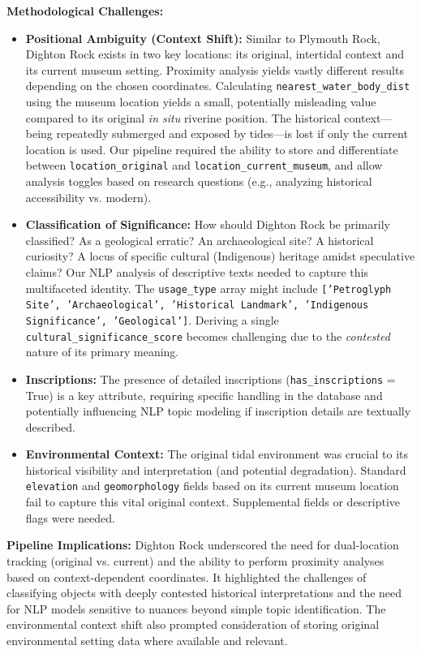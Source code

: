 \documentclass[
11pt, %
english, %
singlespacing, %
headsepline, %
]{MastersDoctoralThesis} %
\begin{document}
\textbf{Methodological Challenges:}
\begin{itemize}
    \item \textbf{Positional Ambiguity (Context Shift):} Similar to Plymouth Rock, Dighton Rock exists in two key locations: its original, intertidal context and its current museum setting. Proximity analysis yields vastly different results depending on the chosen coordinates. Calculating \texttt{nearest\_water\_body\_dist} using the museum location yields a small, potentially misleading value compared to its original \emph{in situ} riverine position. The historical context—being repeatedly submerged and exposed by tides—is lost if only the current location is used. Our pipeline required the ability to store and differentiate between \texttt{location\_original} and \texttt{location\_current\_museum}, and allow analysis toggles based on research questions (e.g., analyzing historical accessibility vs. modern).
    \item \textbf{Classification of Significance:} How should Dighton Rock be primarily classified? As a geological erratic? An archaeological site? A historical curiosity? A locus of specific cultural (Indigenous) heritage amidst speculative claims? Our NLP analysis of descriptive texts needed to capture this multifaceted identity. The \texttt{usage\_type} array might include \texttt{['Petroglyph Site', 'Archaeological', 'Historical Landmark', 'Indigenous Significance', 'Geological']}. Deriving a single \texttt{cultural\_significance\_score} becomes challenging due to the \emph{contested} nature of its primary meaning.
    \item \textbf{Inscriptions:} The presence of detailed inscriptions (\texttt{has\_inscriptions} = True) is a key attribute, requiring specific handling in the database and potentially influencing NLP topic modeling if inscription details are textually described.
    \item \textbf{Environmental Context:} The original tidal environment was crucial to its historical visibility and interpretation (and potential degradation). Standard \texttt{elevation} and \texttt{geomorphology} fields based on its current museum location fail to capture this vital original context. Supplemental fields or descriptive flags were needed.
\end{itemize}

\textbf{Pipeline Implications:} Dighton Rock underscored the need for dual-location tracking (original vs. current) and the ability to perform proximity analyses based on context-dependent coordinates. It highlighted the challenges of classifying objects with deeply contested historical interpretations and the need for NLP models sensitive to nuances beyond simple topic identification. The environmental context shift also prompted consideration of storing original environmental setting data where available and relevant.
\end{document}
